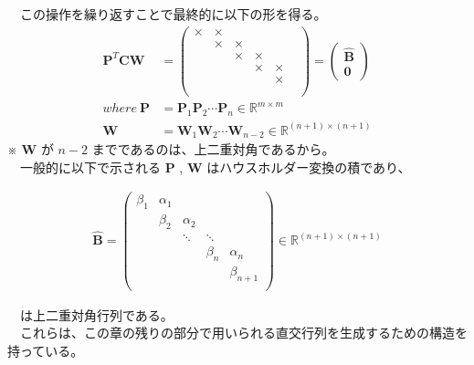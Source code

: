 \documentclass[dvipdfmx,10pt,presentation]{beamer}
\begin{document}
\begin{frame}[label={sec:org2c3e07f}]{}
　この操作を繰り返すことで最終的に以下の形を得る。\\
\begin{align*}
\bm{P}^T\bm{C}\bm{W} &=
\begin{pmatrix}
\times & \times & & & \\
 & \times & \times& & \\
 & & \times & \times &  \\
&&&\times & \times  \\
&&&& \times   \\
&&&&& \\
\end{pmatrix}
=
\begin{pmatrix}
\hat{\bm{B}}\\
\bm{0}
\end{pmatrix} \\
where\ \bm{P} &= \bm{P}_1 \bm{P}_2 \cdots \bm{P}_n \in \mathbb{R}^{m \times m}\\
\bm{W} &= \bm{W}_1 \bm{W}_2 \cdots \bm{W}_{n-2} \in \mathbb{R}^{(n+1)\times(n+1)}
 \tag{7.6}
\end{align*}
※ \(\bm{W}\) が \(n-2\) までであるのは、上二重対角であるから。\\

　一般的に以下で示される \(\bm{P}\) , \(\bm{W}\) はハウスホルダー変換の積であり、\\
\end{frame}
\begin{frame}[label={sec:org3c21086}]{}
\begin{align*}
\hat{\bm{B}} =
\begin{pmatrix}
\beta_1& \alpha_1& & & \\
&\beta_2& \alpha_2&  & \\
&&\ddots& \ddots &   \\
&&& \beta_n& \alpha_n   \\
&&&& \beta_{n+1}   \\
\end{pmatrix}
\in \mathbb{R}^{(n+1)\times(n+1)}
\end{align*}

　は上二重対角行列である。\\
　これらは、この章の残りの部分で用いられる直交行列を生成するための構造を持っている。\\
\end{frame}
\end{document}
